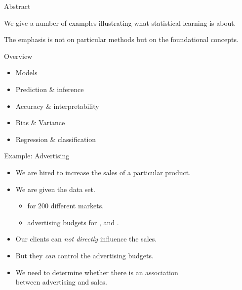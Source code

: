 \documentclass[mathserif, aspectratio=169]{beamer}
\subtitle{\bfseries%
  {Statistical Learning}\\%
  {\tiny\it what is it?, models, regression, classification, prediction, inference, accuracy, bias, variance}\\%
}
\begin{document}


\begin{frame}{Abstract}

	\begin{blurb}
		We give a number of examples illustrating what statistical learning
		is about.
		
		The emphasis is not on particular methods but on the foundational concepts.

	\end{blurb}
\end{frame}

\begin{frame}{Overview}
	\begin{itemize}
		\item Models
		\item Prediction \& inference
		\item Accuracy  \& interpretability
		\item Bias \& Variance
		\item Regression \& classification
	\end{itemize}
\end{frame}

\begin{frame}{Example: Advertising}
	\begin{itemize}
		\item We are hired to increase the sales of a particular product.
		\item We are given the  data set.
			\begin{itemize}
				\item {} for 200 different markets.
				\item advertising budgets for ,  and .
			\end{itemize}
		\item Our clients can \emph{not directly} influence the sales.
		\item But they \emph{can} control the advertising budgets.
		\item We need to determine whether there is an association \\
			between advertising and sales. 
	\end{itemize}
\end{frame}
\end{document}
